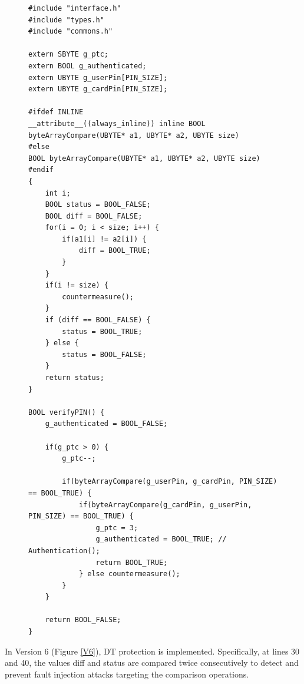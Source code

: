 \begin{figure}
\begin{lstlisting}[caption={code.c of VerifyPin function in benchmark V5}, label={V5}, basicstyle=\ttfamily\footnotesize]
#include "interface.h"
#include "types.h"
#include "commons.h"

extern SBYTE g_ptc;
extern BOOL g_authenticated;
extern UBYTE g_userPin[PIN_SIZE];
extern UBYTE g_cardPin[PIN_SIZE];

#ifdef INLINE
__attribute__((always_inline)) inline BOOL byteArrayCompare(UBYTE* a1, UBYTE* a2, UBYTE size)
#else
BOOL byteArrayCompare(UBYTE* a1, UBYTE* a2, UBYTE size)
#endif
{
    int i;
    BOOL status = BOOL_FALSE;
    BOOL diff = BOOL_FALSE;
    for(i = 0; i < size; i++) {
        if(a1[i] != a2[i]) {
            diff = BOOL_TRUE;
        }
    }
    if(i != size) {
        countermeasure();
    }
    if (diff == BOOL_FALSE) {
        status = BOOL_TRUE;
    } else {
        status = BOOL_FALSE;
    }
    return status;
}

BOOL verifyPIN() {
    g_authenticated = BOOL_FALSE;

    if(g_ptc > 0) {
        g_ptc--;

        if(byteArrayCompare(g_userPin, g_cardPin, PIN_SIZE) == BOOL_TRUE) {
            if(byteArrayCompare(g_cardPin, g_userPin, PIN_SIZE) == BOOL_TRUE) {
                g_ptc = 3;
                g_authenticated = BOOL_TRUE; // Authentication();
                return BOOL_TRUE;
            } else countermeasure();
        }
    }

    return BOOL_FALSE;
}
\end{lstlisting}
\end{figure}

In Version 6 (Figure \ref{V6}), DT protection is implemented. Specifically, at lines 30 and 40, the values diff and status are compared twice consecutively to detect and prevent fault injection attacks targeting the comparison operations.

